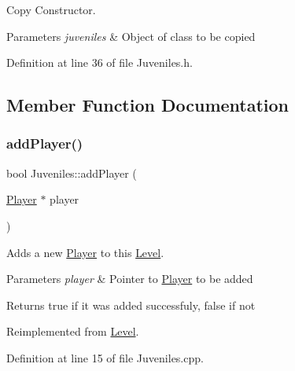 Copy Constructor. 


\begin{DoxyParams}{Parameters}
{\em juveniles} & Object of class to be copied \\
\hline
\end{DoxyParams}


Definition at line 36 of file Juveniles.\+h.



\subsection{Member Function Documentation}
\hypertarget{class_juveniles_a596c6380325142d8c49c8d8db7b9fa31}{}\label{class_juveniles_a596c6380325142d8c49c8d8db7b9fa31} 
\subsubsection{\texorpdfstring{add\+Player()}{addPlayer()}}
{\footnotesize\ttfamily bool Juveniles\+::add\+Player (\begin{DoxyParamCaption}\item[{\hyperlink{class_player}{Player} $\ast$}]{player }\end{DoxyParamCaption})\hspace{0.3cm}{\ttfamily [virtual]}}



Adds a new \hyperlink{class_player}{Player} to this \hyperlink{class_level}{Level}. 


\begin{DoxyParams}{Parameters}
{\em player} & Pointer to \hyperlink{class_player}{Player} to be added \\
\hline
\end{DoxyParams}
\begin{DoxyReturn}{Returns}
true if it was added successfuly, false if not 
\end{DoxyReturn}


Reimplemented from \hyperlink{class_level_a66290778fa4bcd2f29b9ff3e605b2902}{Level}.



Definition at line 15 of file Juveniles.\+cpp.

\hypertarget{class_juveniles_a062cff0b64c844c3e9cc9b41e768cce6}{}\label{class_juveniles_a062cff0b64c844c3e9cc9b41e768cce6} 
